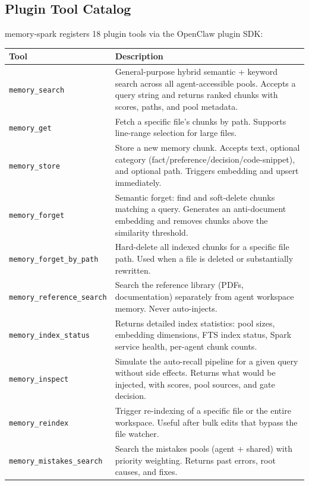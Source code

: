 \documentclass[11pt]{article}
\begin{document}
\subsection{Plugin Tool Catalog}

memory-spark registers 18 plugin tools via the OpenClaw plugin SDK:

\begin{longtable}{lp{9cm}}
\toprule
\textbf{Tool} & \textbf{Description} \\
\midrule
\endhead
\texttt{memory\_search} & General-purpose hybrid semantic + keyword search across all
  agent-accessible pools. Accepts a query string and returns ranked chunks with scores,
  paths, and pool metadata. \\[4pt]
\texttt{memory\_get} & Fetch a specific file's chunks by path. Supports line-range
  selection for large files. \\[4pt]
\texttt{memory\_store} & Store a new memory chunk. Accepts text, optional category
  (fact/preference/decision/code-snippet), and optional path. Triggers embedding and
  upsert immediately. \\[4pt]
\texttt{memory\_forget} & Semantic forget: find and soft-delete chunks matching a query.
  Generates an anti-document embedding and removes chunks above the similarity
  threshold. \\[4pt]
\texttt{memory\_forget\_by\_path} & Hard-delete all indexed chunks for a specific file
  path. Used when a file is deleted or substantially rewritten. \\[4pt]
\texttt{memory\_reference\_search} & Search the reference library (PDFs, documentation)
  separately from agent workspace memory. Never auto-injects. \\[4pt]
\texttt{memory\_index\_status} & Returns detailed index statistics: pool sizes, embedding
  dimensions, FTS index status, Spark service health, per-agent chunk counts. \\[4pt]
\texttt{memory\_inspect} & Simulate the auto-recall pipeline for a given query without
  side effects. Returns what would be injected, with scores, pool sources, and gate
  decision. \\[4pt]
\texttt{memory\_reindex} & Trigger re-indexing of a specific file or the entire
  workspace. Useful after bulk edits that bypass the file watcher. \\[4pt]
\texttt{memory\_mistakes\_search} & Search the mistakes pools (agent + shared) with
  priority weighting. Returns past errors, root causes, and fixes. \\[4pt]

\end{longtable}
\end{document}
